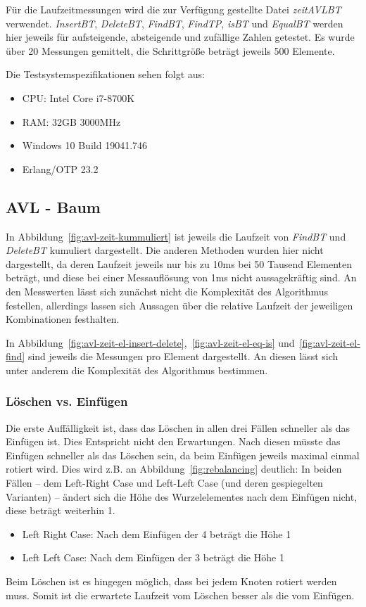 Für die Laufzeitmessungen wird die zur Verfügung gestellte Datei \textit{zeitAVLBT} verwendet.
\textit{InsertBT}, \textit{DeleteBT}, \textit{FindBT}, \textit{FindTP}, \textit{isBT} und
\textit{EqualBT} werden hier jeweils für aufsteigende, absteigende und zufällige Zahlen getestet.
Es wurde über 20 Messungen gemittelt, die Schrittgröße beträgt jeweils 500 Elemente.

Die Testsystemspezifikationen sehen folgt aus:
\begin{itemize}
    \item CPU: Intel Core i7-8700K
    \item RAM: 32GB 3000MHz
    \item Windows 10 Build 19041.746
    \item Erlang/OTP 23.2
\end{itemize}

\subsection{AVL - Baum}\label{subsec:laufzeitmessung-avl}

In Abbildung~\ref{fig:avl-zeit-kummuliert} ist jeweils die Laufzeit von \textit{FindBT} und
\textit{DeleteBT} kumuliert dargestellt.
Die anderen Methoden wurden hier nicht dargestellt, da deren Laufzeit jeweils nur bis zu 10ms bei
50 Tausend Elementen beträgt, und diese bei einer Messauflösung von 1ms nicht aussagekräftig
sind.
An den Messwerten lässt sich zunächst nicht die Komplexität des Algorithmus festellen,
allerdings lassen sich Aussagen über die relative Laufzeit der jeweiligen Kombinationen festhalten.

In Abbildung~\ref{fig:avl-zeit-el-insert-delete},~\ref{fig:avl-zeit-el-eq-is}
und~\ref{fig:avl-zeit-el-find} sind jeweils die Messungen pro Element dargestellt.
An diesen lässt sich unter anderem die Komplexität des Algorithmus bestimmen.

\subsubsection{Löschen vs. Einfügen}
Die erste Auffälligkeit ist, dass das Löschen in allen drei Fällen schneller als das Einfügen ist.
Dies Entspricht nicht den Erwartungen.
Nach diesen müsste das Einfügen schneller als das Löschen sein, da beim Einfügen jeweils maximal
einmal rotiert wird.
Dies wird z.B. an Abbildung~\ref{fig:rebalancing} deutlich:
In beiden Fällen -- dem Left-Right Case und Left-Left Case (und deren gespiegelten Varianten) --
ändert sich die Höhe des Wurzelelementes nach dem Einfügen nicht, diese beträgt weiterhin 1.
\begin{itemize}
    \item Left Right Case: Nach dem Einfügen der 4 beträgt die Höhe 1
    \item Left Left Case: Nach dem Einfügen der 3 beträgt die Höhe 1
\end{itemize}
Beim Löschen ist es hingegen möglich, dass bei jedem Knoten rotiert werden muss.
Somit ist die erwartete Laufzeit vom Löschen besser als die vom Einfügen.

